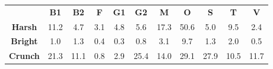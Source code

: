 \begin{tabular}{|c||c|c|c|c|c|c|c|c|c|c|}
	\cline{2-11}
	\multicolumn{1}{c|}{} & \bf{B1} & \bf{B2} & \bf{F} & \bf{G1} & \bf{G2} & \bf{M} & \bf{O} & \bf{S} & \bf{T} & \bf{V} \tabularnewline
	\hhline{-::=:=:=:=:=:=:=:=:=:=:}
	\bf{Harsh} & 11.2 &  4.7 &  3.1 &  4.8 &  5.6 & 17.3 & 50.6 &  5.0 &  9.5 &  2.4 \tabularnewline
	\hline
	\bf{Bright} & 1.0 & 1.3 & 0.4 & 0.3 & 0.8 & 3.1 & 9.7 & 1.3 & 2.0 & 0.5 \tabularnewline
	\hline
	\bf{Crunch} & 21.3 & 11.1 &  0.8 &  2.9 & 25.4 & 14.0 & 29.1 & 27.9 & 10.5 & 11.7 \tabularnewline
	\hline
\end{tabular}
